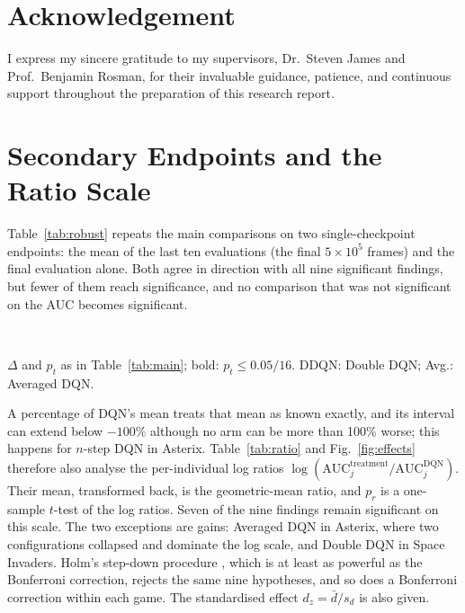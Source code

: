 \documentclass[conference,a4paper]{IEEEtran}
\newcommand{\results}{../analysis_output/corrected-rct-01/report}
\begin{document}
\section*{Acknowledgement}
I express my sincere gratitude to my supervisors, Dr.\ Steven James and Prof.\ Benjamin Rosman,
for their invaluable guidance, patience, and continuous support throughout the preparation of this research report.




\appendices
\section{Secondary Endpoints and the Ratio Scale}\label{app:results}
Table~\ref{tab:robust} repeats the main comparisons on two single-checkpoint endpoints: the mean of the last ten
evaluations (the final $5\times10^{5}$ frames) and the final evaluation alone. Both agree in direction with all nine
significant findings, but fewer of them reach significance, and no comparison that was not significant on the AUC
becomes significant.

\begin{table}[h]
\caption{Secondary Endpoints: Paired Comparisons with DQN}
\label{tab:robust}
\centering
\footnotesize
\setlength{\tabcolsep}{4pt}
\\[3pt]
\parbox{\columnwidth}{\scriptsize $\Delta$ and $p_t$ as in Table~\ref{tab:main}; bold: $p_t\le0.05/16$. DDQN: Double
DQN; Avg.: Averaged DQN.}
\end{table}

A percentage of DQN's mean treats that mean as known exactly, and its interval can extend below $-100\%$ although no
arm can be more than 100\% worse; this happens for $n$-step DQN in Asterix. Table~\ref{tab:ratio} and
Fig.~\ref{fig:effects} therefore also analyse the per-individual log ratios
$\log(\mathrm{AUC}_j^{\mathrm{treatment}}/\mathrm{AUC}_j^{\mathrm{DQN}})$. Their mean, transformed back, is the
geometric-mean ratio, and $p_r$ is a one-sample $t$-test of the log ratios. Seven of the nine findings remain
significant on this scale. The two exceptions are gains: Averaged DQN in Asterix, where two configurations collapsed and
dominate the log scale, and Double DQN in Space Invaders. Holm's step-down procedure \citep{holm1979simple}, which is
at least as powerful as the Bonferroni correction, rejects the same nine hypotheses, and so does a Bonferroni correction
within each game. The standardised effect $d_z=\bar d/s_d$ \citep{lakens2013calculating} is also given.
\end{document}

